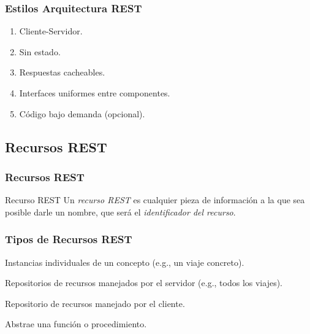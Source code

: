 \documentclass[a4paper,slidestop,xcolor=pst,blue]{beamer}
\begin{document}
\begin{frame}[c]
	\frametitle{Estilos Arquitectura REST}
    \begin{enumerate}[<+->]
        \item Cliente-Servidor.
        \item Sin estado.
        \item Respuestas cacheables.
        \item Interfaces uniformes entre componentes.
        \item Código bajo demanda (opcional).
    \end{enumerate}
\end{frame}

\subsection{Recursos REST}

\begin{frame}[c]
	\frametitle{Recursos REST}
    \begin{block}{Recurso REST}
        Un \emph{recurso REST} es cualquier pieza de información a la que sea posible darle un nombre, que será el \emph{identificador del recurso}.
    \end{block}
\end{frame}

\begin{frame}[c]
    \frametitle{Tipos de Recursos REST}
    \begin{description}[<+->]
        \item[Documentos] Instancias individuales de un concepto (e.g., un viaje concreto).
        \item[Colecciones] Repositorios de recursos manejados por el servidor (e.g., todos los viajes).
        \item[Store] Repositorio de recursos manejado por el cliente.
        \item[Controller] Abstrae una función o procedimiento.
    \end{description}
\end{frame}
\end{document}
